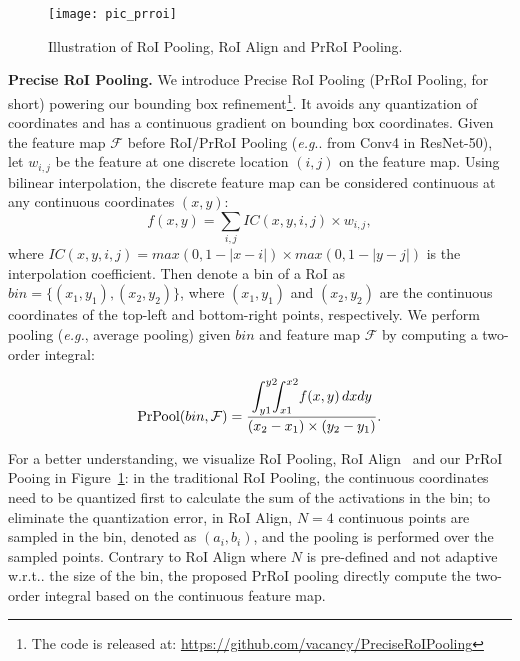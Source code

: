 \documentclass[runningheads]{llncs}
\makeatletter
\newcommand{\myparagraph}[1]{{\noindent \bf #1}}
\DeclareRobustCommand\onedot{\futurelet\@let@token\@onedot}
\def\@onedot{\ifx\@let@token.\else.\null\fi\xspace}
\def\eg{\emph{e.g}\onedot} \def\Eg{\emph{E.g}\onedot}
\def\wrt{w.r.t\onedot} \def\dof{d.o.f\onedot}
\makeatother
\begin{document}
\begin{figure}[t]
       \centering
    \texttt{[image: pic\_prroi]}
    \caption{Illustration of RoI Pooling, RoI Align and PrRoI Pooling.}
    \label{fig:prroi}
    \vspace{-0.5em}
\end{figure}

\vspace{1em}
\myparagraph{Precise RoI Pooling.}
\newcommand{\prpool}{\mathrm{PrPool}}
We introduce Precise RoI Pooling (PrRoI Pooling, for short) powering our bounding box refinement\footnote{The code is released at: \url{https://github.com/vacancy/PreciseRoIPooling}}. It avoids any quantization of coordinates and has a continuous gradient on bounding box coordinates. Given the feature map $\mathcal{F}$ before RoI/PrRoI Pooling (\eg from Conv4 in ResNet-50), let $w_{i,j}$ be the feature at one discrete location $(i,j)$ on the feature map. Using bilinear interpolation, the discrete feature map can be considered continuous at any continuous coordinates $(x,y)$:
\begin{equation}
f(x,y) = \sum_{i,j}IC(x,y,i,j) \times w_{i,j},
\end{equation}
where $IC(x,y,i,j) = max(0,1-|x-i|)\times max(0,1-|y-j|)$ is the interpolation coefficient. Then denote a bin of a RoI as $bin=\{(x_1,y_1),(x_2,y_2)\}$, where $(x_1,y_1)$ and $(x_2,y_2)$ are the continuous coordinates of the top-left and bottom-right points, respectively. We perform pooling ({\it e.g.}, average pooling) given $bin$ and feature map $\mathcal{F}$ by computing a two-order integral:

\begin{equation}
\prpool(bin,\mathcal{F}) = \frac{ \displaystyle\int_{y1}^{y2}\hspace{-0.2cm}\int_{x1}^{x2}\!f(x,y)\,dxdy }{(x_2-x_1) \times (y_2-y_1)}.
\label{eqn:PrRoI}
\end{equation}

For a better understanding, we visualize RoI Pooling, RoI Align~\cite{he2017mask} and our PrRoI Pooing in Figure~\ref{fig:prroi}: in the traditional RoI Pooling, the continuous coordinates need to be quantized first to calculate the sum of the activations in the bin; to eliminate the quantization error, in RoI Align, $N=4$ continuous points are sampled in the bin, denoted as $(a_i, b_i)$, and the pooling is performed over the sampled points. Contrary to RoI Align where $N$ is pre-defined and not adaptive \wrt the size of the bin, the proposed PrRoI pooling directly compute the two-order integral based on the continuous feature map.
\end{document}
